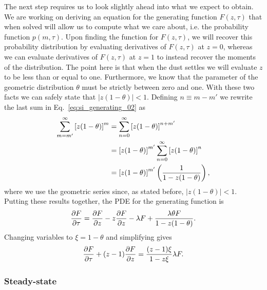 The next step requires us to look slightly ahead into what we expect to obtain.
We are working on deriving an equation for the generating function $F(z, \tau)$
that when solved will allow us to compute what we care about, i.e. the
probability function $p(m, \tau)$. Upon finding the function for $F(z, \tau)$,
we will recover this probability distribution by evaluating derivatives
of $F(z, \tau)$ at $z=0$, whereas we can evaluate derivatives of
$F(z, \tau)$ at $z=1$ to instead recover the moments of the
distribution. The point here is that when the dust settles we
will evaluate $z$ to be less than or equal to one.
Furthermore, we know that the parameter of the geometric distribution $\theta$
must be strictly between zero and one. With these two facts we can safely state that
$| z (1 - \theta) | < 1$. Defining $n \equiv m - m'$ we rewrite the last sum in
Eq.~\ref{eq:si_generating_02} as
\begin{align}
\sum_{m=m'}^{\infty} \left[z (1-\theta)\right]^{m} &= 
\sum_{n=0}^{\infty} \left[z (1-\theta)\right]^{n + m'} \\
&= \left[ z (1 - \theta) \right]^{m'} 
\sum_{n=0}^{\infty} \left[ z (1 - \theta) \right]^{n} \\
&= \left[ z (1 - \theta) \right]^{m'} 
\left( {1 \over 1 - z (1 - \theta)} \right),
\end{align}
where we use the geometric series since, as stated before, $| z (1 - \theta) | <
1$. Putting these results together, the PDE for the generating function is
\begin{equation}
{\partial F \over \partial \tau} = 
{\partial F \over\partial z}
- z {\partial F \over \partial z} - \lambda F
+ \frac{\lambda\theta F}{1-z(1-\theta)}.
\end{equation}
Changing variables to $\xi=1-\theta$ and simplifying gives
\begin{align}
{\partial F \over \partial \tau} + (z - 1) {\partial F \over \partial z} = 
\frac{(z-1)\xi}{1-z\xi}\lambda F.
\label{eq:1state_unreg_015}
\end{align}

\subsubsection{Steady-state}

